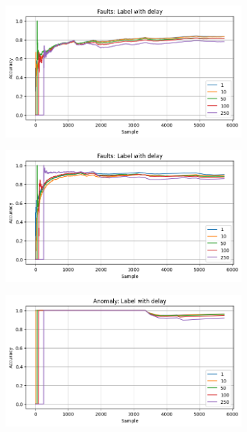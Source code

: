 \begin{figure}[ht]
    \centering
    \begin{subfigure}[b]{0.49\textwidth}
        \includegraphics[width=\textwidth]{assets/design/gradual-learning-delay-temporal-domain-fault.png}
        \caption{}
    \end{subfigure}
    \hfill
    \begin{subfigure}[b]{0.49\textwidth}
        \includegraphics[width=\textwidth]{assets/design/gradual-learning-delay-spectral-domain-fault.png}
        \caption{}
    \end{subfigure}
    \begin{subfigure}[b]{0.49\textwidth}
        \includegraphics[width=\textwidth]{assets/design/gradual-learning-delay-temporal-domain-anomaly60.png}

\end{subfigure}
\end{figure}
